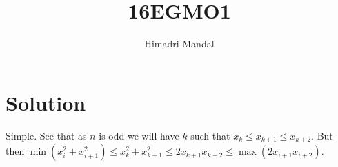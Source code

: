 \documentclass[11pt]{scrartcl}
\title{16EGMO1}
\author{Himadri Mandal}
\begin{document}
\maketitle

\section{Solution}
\begin{soln}
	
	Simple. See that as $n$ is odd we will have $k$ such that $x_k \leq x_{k+1} \leq x_{k+2}$. 
	But then $\min(x_i^2 + x_{i+1}^2) \leq x_k^2 + x_{k+1}^2 \leq 2 x_{k+1}x_{k+2} \leq \max(2x_{i+1}x_{i+2})$.

\end{soln}
\end{document}
